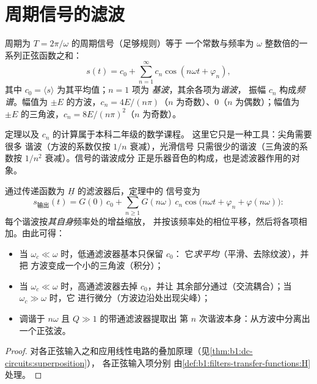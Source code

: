\section{周期信号的滤波}

\begin{theorem}[傅里叶分解]\label{thm:b1:filters-transfer-functions:fourier}
周期为 $T = 2\pi/\omega$ 的周期信号（足够规则）等于
一个常数与频率为 $\omega$ 整数倍的一系列正弦函数之和：
\[
s(t) = c_0 + \sum_{n = 1}^{\infty} c_n\cos(n\omega t + \varphi_n),
\]
其中 $c_0 = \langle s\rangle$ 为其平均值；$n = 1$ 项为
\emph{基波}，其余各项为\emph{谐波}，
振幅 $c_n$ 构成\emph{频谱}。幅值为
$\pm E$ 的方波，$c_n = 4E/(n\pi)$（$n$ 为奇数）、$0$（$n$ 为偶数）；幅值为
$\pm E$ 的三角波，$c_n = 8E/(n\pi)^2$（$n$ 为奇数）。
\end{theorem}
\admitted

\begin{remark}[要点]\label{rem:b1:filters-transfer-functions:fourier}
定理以及 $c_n$ 的计算属于本科二年级的数学课程。
这里它只是一种工具：尖角需要很多
谐波（方波的系数仅按 $1/n$ 衰减），光滑信号
只需很少的谐波（三角波的系数按 $1/n^2$ 衰减）。信号的谐波成分
正是乐器音色的构成，也是滤波器作用的对象。
\end{remark}

\begin{proposition}[周期信号的线性滤波]\label{prop:b1:filters-transfer-functions:filtering}
通过传递函数为 $\underline H$ 的滤波器后，定理中的
信号变为
\[
s_{\text{输出}}(t) = G(0)\,c_0 + \sum_{n \geq 1} G(n\omega)\,c_n\cos\!\big(n\omega t + \varphi_n + \varphi(n\omega)\big):
\]
每个谐波按\emph{其自身}频率处的增益缩放，
并按该频率处的相位平移，然后将各项相加。由此可得：
\begin{itemize}
  \item 当 $\omega_c \ll \omega$ 时，低通滤波器基本只保留 $c_0$：
        它\emph{求平均}（平滑、去除纹波），并把
        方波变成一个小的三角波（积分）；
  \item 当 $\omega_c \ll \omega$ 时，高通滤波器去掉 $c_0$，并让
        其余部分通过（交流耦合）；当 $\omega_c \gg \omega$ 时，它
        进行微分（方波边沿处出现尖峰）；
  \item 调谐于 $n\omega$ 且 $Q \gg 1$ 的带通滤波器提取出
        第 $n$ 次谐波本身：从方波中分离出一个正弦波。
\end{itemize}
\end{proposition}

\begin{proof}
对各正弦输入之和应用线性电路的叠加原理（见\cref{thm:b1:dc-circuits:superposition}），
各正弦输入项分别
由\cref{def:b1:filters-transfer-functions:H}处理。
\end{proof}


